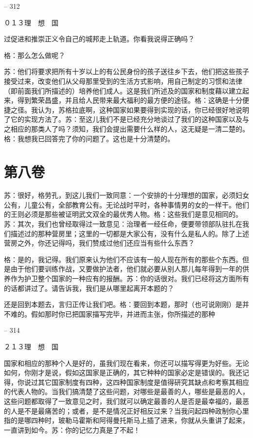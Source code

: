 \documentclass[11pt,oneside]{book}
\begin{document}
\begin{common-format}
    

-- 312

    ０１３理　想　国

    过促进和推崇正义令自己的城邦走上轨道。你看我说得正确吗？

    格：那么怎么做呢？

    苏：他们将要求把所有十岁以上的有公民身份的孩子送往乡下去，他们把这些孩子接受过来，改变他们从父母那里受到的生活方式影响，用自己制定的习惯和法律（即前面我们所描述的）培养他们成人。这是我们所述及的国家和制度藉以建立起来，得到繁荣昌盛，并且给人民带来最大福利的最方便的途径。格：这确是十分便捷之径。我认为，苏格拉底啊，这种国家如果要得到实现的话，你已经很好地说明了它的实现方法了。苏：至这儿我们不是已经充分地谈过了我们的这种国家以及与之相应的那类人了吗？须知，我们会提出需要什么样的人，这无疑是一清二楚的。格：我想我已回答完了你的问题了。这也是十分清楚的。

    

\chapter{第八卷}
苏：很好，格劳孔，到这儿我们一致同意：一个安排的十分理想的国家，必须妇女公有，儿童公有，全部教育公有。无论战时平时，各种事情男的女的一样干。他们的王则必须是那些被证明武文双全的最优秀人物。格：这些我们是意见相同的。苏：其次，我们也曾经取得过一致意见：治理者一经任命，便要带领部队驻扎在我们描述过的那种营房里；这里的一切都是大家公有，没有什么是私人的。除了上述营房之外，你还记得吗，我们赞成过他们还应当有些什么东西？

    格：是的，我记得。我们原来认为他们不应该有一般人现在所有的那些个东西。但是由于他们要训练作战，又要做护法者，他们就必要从别人那儿每年得到一年的供养作为护卫整个国家的一种应有的报酬。苏：你的话很对。我们已经将这方面所有的话都讲过了。请告诉我，我们是从哪里起离开本题的？

    还是回到本题去，言归正传让我们吧。格：要回到本题，那时（也可说刚刚）是并不难的。假如那时你已把国家描写完毕，并进而主张，你所描述的那种

    

-- 314

    ２１３理　想　国

    国家和相应的那种个人是好的，虽我们现在看来，你还可以描写得更为好些。无论如何，你刚才是说，假如这国家是正确的，其它种种的国家必定是错误的。我还记得，你说过其它国家制度有四种，这四种国家制度是值得研究其缺点和考察其相应的代表人物的。当我们搞清楚了这些问题，对哪些是最善的人，哪些是最恶的人，这些问题都取得了一致意见之时，我们就可以确定最善的人是否是最幸福的，最恶的人是不是最痛苦的；或者，是不是情况正好相反过来？当我问起四种政制你心里指的是哪四种时，玻勒马霍斯和阿得曼托斯马上插了进来，你就从头重讲了起来，一直讲到如今。苏：你的记忆力真是了不起！


\end{common-format}
\end{document}
